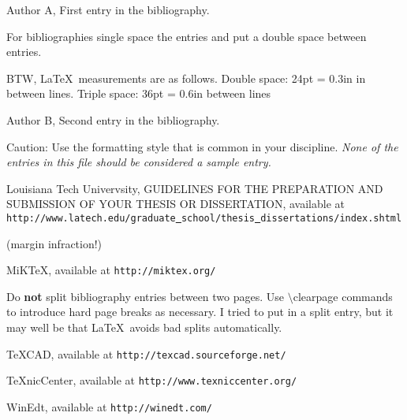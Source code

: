 

\begin{thebibliography}{99}
\setlength{\itemsep}{0.3in}

Author A,
First entry in the bibliography.


For bibliographies single space the entries and put a double space between
entries.

BTW, \LaTeX \ measurements are
as follows. Double space: 24pt = 0.3in in between lines.
Triple space: 36pt = 0.6in between lines


Author B,
Second entry in the bibliography.

Caution:
Use the formatting style that is common in your discipline.
{\em None of the entries in this file should be considered a sample entry.}




Louisiana Tech Univervsity,
GUIDELINES FOR THE
PREPARATION AND SUBMISSION
OF YOUR THESIS OR DISSERTATION,
available at
{\tt http://www.latech.edu/graduate\underline{~}school/thesis\underline{~}dissertations/index.shtml}

(margin infraction!)


MiKTeX, available at
{\tt http://miktex.org/}


Do {\bf not} split bibliography entries between two pages.
Use $\setminus $clearpage commands to introduce hard page breaks
as necessary.
I tried to put in a split entry, but it may well be that
\LaTeX \ avoids bad splits automatically.


\TeX CAD, available at {\tt http://texcad.sourceforge.net/}



TeXnicCenter, available at
{\tt http://www.texniccenter.org/}

WinEdt, available at
{\tt http://winedt.com/}




\end{thebibliography}
